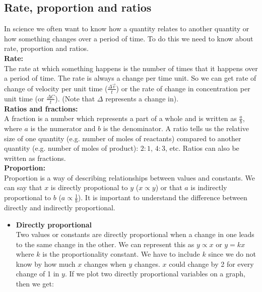 \begin{enumerate}[label=\textbf{\arabic*}.]
\subsection*{Rate, proportion and ratios}
In science we often want to know how a quantity relates to another quantity or how something changes over a period of time. To do this we need to know about rate, proportion and ratios. \\
\textbf{Rate:}\\
The rate at which something happens is the number of times that it happens over a period of time. The rate is always a change per time unit. So we can get rate of change of velocity per unit time ($\frac{\Delta \vec{v}}{t}$) or the rate of change in concentration per unit time (or $\frac{\Delta{C}}{t}$). (Note that $\Delta$ represents a change in). \\
\textbf{Ratios and fractions:}\\
A fraction is a number which represents a part of a whole and is written as $\frac{a}{b}$, where $a$ is the numerator and $b$ is the denominator. A ratio tells us the relative size of one quantity (e.g. number of moles of reactants) compared to another quantity (e.g. number of moles of product): $2:1$, $4:3$, etc. Ratios can also be written as fractions. \\
\textbf{Proportion:}\\
Proportion is a way of describing relationships between values and constants. We can say that $x$ is directly propotional to $y$ ($x \propto y$) or that $a$ is indirectly proportional to $b$ ($a \propto \frac{1}{b}$). It is important to understand the difference between directly and indirectly proportional.
\begin{itemize}
 \item \textbf{Directly proportional}\\
Two values or constants are directly proportional when a change in one leads to the same change in the other. We can represent this as $y \propto x$ or $y = kx$ where $k$ is the proportionality constant. We have to include $k$ since we do not know by how much $x$ changes when $y$ changes. $x$ could change by 2 for every change of 1 in $y$. If we plot two directly proportional variables on a graph, then we get:\\
 

\end{itemize}
\end{enumerate}
